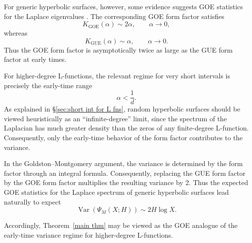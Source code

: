 \documentclass[12pt]{amsart}
\begin{document}
For generic hyperbolic surfaces, however,  some 
evidence suggests GOE statistics for the Laplace eigenvalues \cite{BGS, AS, RudGOE}. 
The corresponding GOE form factor satisfies
\[
K_{\mathrm{GOE}}(\alpha)\sim 2\alpha,
\qquad
\alpha\to 0,
\]
whereas
\[
K_{\mathrm{GUE}}(\alpha)\sim \alpha,
\qquad
\alpha\to 0.
\]
Thus the GOE form factor is asymptotically twice as large as the GUE
form factor at early times.

For higher-degree L-functions, the relevant regime for very short
intervals is precisely the early-time range
\[
\alpha<\frac1d.
\]
As explained in \S\ref{sec:short int for L fns}, random hyperbolic surfaces should be viewed
heuristically as an ``infinite-degree'' limit, since the spectrum of
the Laplacian has much greater density than the zeros of any
finite-degree L-function. Consequently, only the early-time
behavior of the form factor contributes to the variance.

In the Goldston--Montgomery argument,
the variance is determined by the form factor through an integral
formula. Consequently, replacing the GUE form factor by the GOE
form factor multiplies the resulting variance by $2$. Thus the expected GOE statistics for the
Laplace spectrum of generic hyperbolic surfaces lead naturally to
expect 
\[
\operatorname{Var}(\Psi_M(X;H))
\sim
2H\log X.
\]

Accordingly, Theorem~\ref{main thm} may be viewed as the GOE analogue of the
early-time variance regime for higher-degree L-functions.


 
\end{document}
